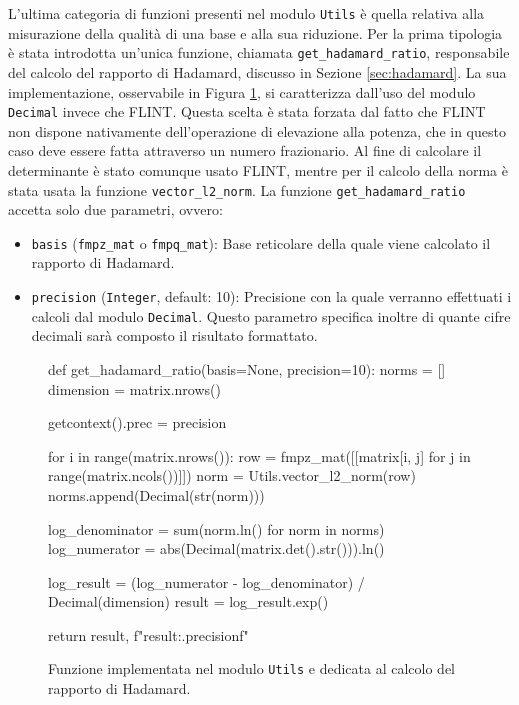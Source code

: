 L'ultima categoria di funzioni presenti nel modulo \texttt{Utils} è quella relativa alla
misurazione della qualità di una base e alla sua riduzione. Per la prima tipologia è 
stata introdotta un'unica funzione, chiamata \texttt{get\_hadamard\_ratio},
responsabile del calcolo del rapporto di Hadamard, discusso
in Sezione \ref{sec:hadamard}. La sua implementazione, osservabile in Figura 
\ref{fig:utilshadamard}, si caratterizza dall'uso del modulo \texttt{Decimal} invece che
FLINT. Questa scelta è stata forzata dal fatto che FLINT non dispone nativamente dell'operazione
di elevazione alla potenza, che in questo caso deve essere fatta attraverso un numero frazionario.
Al fine di calcolare il determinante è stato comunque usato FLINT, mentre per il calcolo 
della norma è stata usata la funzione \texttt{vector\_l2\_norm}. 
La funzione \texttt{get\_hadamard\_ratio} accetta solo due parametri, ovvero:
\begin{itemize}
    \item \texttt{basis} (\texttt{fmpz\_mat} o \texttt{fmpq\_mat}): Base reticolare della
    quale viene calcolato il rapporto di Hadamard.
    \item \texttt{precision} (\texttt{Integer}, default: 10): Precisione con la quale 
    verranno effettuati i calcoli dal modulo \texttt{Decimal}. Questo parametro specifica
    inoltre di quante cifre decimali sarà composto il risultato formattato. 
\end{itemize}

\begin{figure}[H]
    \begin{python}
        def get_hadamard_ratio(basis=None, precision=10):
            norms = []
            dimension = matrix.nrows()
            
            getcontext().prec = precision
            
            for i in range(matrix.nrows()):
                row = fmpz_mat([[matrix[i, j] 
                                    for j in range(matrix.ncols())]])
                norm = Utils.vector_l2_norm(row)
                norms.append(Decimal(str(norm)))
            
            log_denominator = sum(norm.ln() for norm in norms)
            log_numerator = abs(Decimal(matrix.det().str())).ln()
            
            log_result = (log_numerator - log_denominator) /
                                                Decimal(dimension)
            result = log_result.exp()
            
            return result, f"{result:.{precision}f}"
    \end{python}
    \caption{Funzione implementata nel modulo \texttt{Utils} e dedicata al calcolo del rapporto
    di Hadamard.}
    \label{fig:utilshadamard}
\end{figure}

